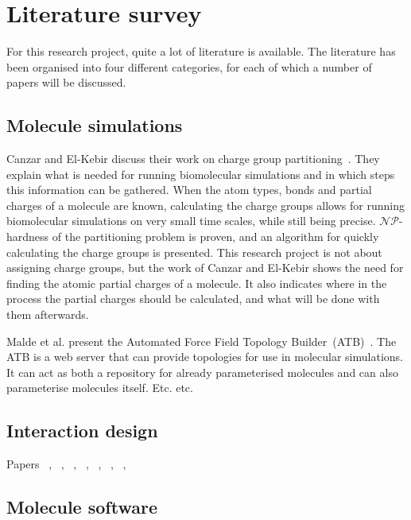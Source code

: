 \chapter{Literature survey}

For this research project, quite a lot of literature is available. The literature has been organised into four different categories, for each of which a number of papers will be discussed.


\section{Molecule simulations}

Canzar and El-Kebir discuss their work on charge group partitioning~\cite{canzar2012charge}. They explain what is needed for running biomolecular simulations and in which steps this information can be gathered. When the atom types, bonds and partial charges of a molecule are known, calculating the charge groups allows for running biomolecular simulations on very small time scales, while still being precise. $\mathcal{NP}$-hardness of the partitioning problem is proven, and an algorithm for quickly calculating the charge groups is presented. This research project is not about assigning charge groups, but the work of Canzar and El-Kebir shows the need for finding the atomic partial charges of a molecule. It also indicates where in the process the partial charges should be calculated, and what will be done with them afterwards.

Malde et al. present the Automated Force Field Topology Builder~(ATB)~\cite{malde2011automated}. The ATB is a web server that can provide topologies for use in molecular simulations. It can act as both a repository for already parameterised molecules and can also parameterise molecules itself. Etc. etc.


\section{Interaction design}

Papers ~\cite{norman2002design}, ~\cite{norman1990interfaces}, ~\cite{norman2002emotion}, ~\cite{norman2005human}, ~\cite{norman2010gestural}, ~\cite{thimbleby2007press}, ~\cite{blair2008user}, ~\cite{badre2002shaping}


\section{Molecule software}

